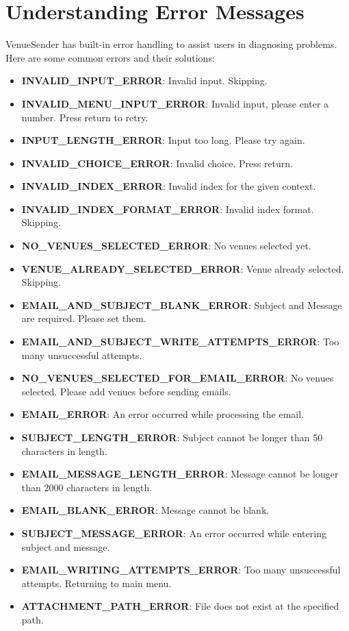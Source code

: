 \documentclass{article}
\begin{document}
	\section*{Understanding Error Messages}
	VenueSender has built-in error handling to assist users in diagnosing problems. Here are some common errors and their solutions:
	\begin{itemize}
		\item \textbf{INVALID\_INPUT\_ERROR}: Invalid input. Skipping.
		\item \textbf{INVALID\_MENU\_INPUT\_ERROR}: Invalid input, please enter a number. Press return to retry.
		\item \textbf{INPUT\_LENGTH\_ERROR}: Input too long. Please try again.
		\item \textbf{INVALID\_CHOICE\_ERROR}: Invalid choice. Press return.
		\item \textbf{INVALID\_INDEX\_ERROR}: Invalid index for the given context.
		\item \textbf{INVALID\_INDEX\_FORMAT\_ERROR}: Invalid index format. Skipping.
		\item \textbf{NO\_VENUES\_SELECTED\_ERROR}: No venues selected yet.
		\item \textbf{VENUE\_ALREADY\_SELECTED\_ERROR}: Venue already selected. Skipping.
		\item \textbf{EMAIL\_AND\_SUBJECT\_BLANK\_ERROR}: Subject and Message are required. Please set them.
		\item \textbf{EMAIL\_AND\_SUBJECT\_WRITE\_ATTEMPTS\_ERROR}: Too many unsuccessful attempts.
		\item \textbf{NO\_VENUES\_SELECTED\_FOR\_EMAIL\_ERROR}: No venues selected. Please add venues before sending emails.
		\item \textbf{EMAIL\_ERROR}: An error occurred while processing the email.
		\item \textbf{SUBJECT\_LENGTH\_ERROR}: Subject cannot be longer than 50 characters in length.
		\item \textbf{EMAIL\_MESSAGE\_LENGTH\_ERROR}: Message cannot be longer than 2000 characters in length.
		\item \textbf{EMAIL\_BLANK\_ERROR}: Message cannot be blank.
		\item \textbf{SUBJECT\_MESSAGE\_ERROR}: An error occurred while entering subject and message.
		\item \textbf{EMAIL\_WRITING\_ATTEMPTS\_ERROR}: Too many unsuccessful attempts. Returning to main menu.
		\item \textbf{ATTACHMENT\_PATH\_ERROR}: File does not exist at the specified path.

\end{itemize}
\end{document}
